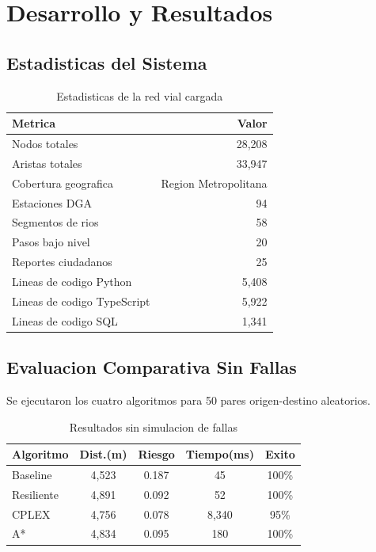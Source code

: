 \documentclass[conference]{IEEEtran}
\begin{document}
\section{Desarrollo y Resultados}

\subsection{Estadisticas del Sistema}

\begin{table}[!t]
\centering
\caption{Estadisticas de la red vial cargada}
\begin{tabular}{@{}lr@{}}
\toprule
\textbf{Metrica} & \textbf{Valor} \\
\midrule
Nodos totales & 28,208 \\
Aristas totales & 33,947 \\
Cobertura geografica & Region Metropolitana \\
\midrule
Estaciones DGA & 94 \\
Segmentos de rios & 58 \\
Pasos bajo nivel & 20 \\
Reportes ciudadanos & 25 \\
\midrule
Lineas de codigo Python & 5,408 \\
Lineas de codigo TypeScript & 5,922 \\
Lineas de codigo SQL & 1,341 \\
\bottomrule
\end{tabular}
\end{table}

\subsection{Evaluacion Comparativa Sin Fallas}

Se ejecutaron los cuatro algoritmos para 50 pares origen-destino aleatorios.

\begin{table}[!t]
\centering
\caption{Resultados sin simulacion de fallas}
\begin{tabular}{@{}lcccc@{}}
\toprule
\textbf{Algoritmo} & \textbf{Dist.(m)} & \textbf{Riesgo} & \textbf{Tiempo(ms)} & \textbf{Exito} \\
\midrule
Baseline & 4,523 & 0.187 & 45 & 100\% \\
Resiliente & 4,891 & 0.092 & 52 & 100\% \\
CPLEX & 4,756 & 0.078 & 8,340 & 95\% \\
A* & 4,834 & 0.095 & 180 & 100\% \\
\bottomrule
\end{tabular}
\end{table}
\end{document}
